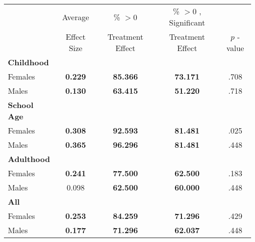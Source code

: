 \begin{tabular}{l c c c c}
\toprule
 & Average & \% $ >0 $ & \% $ >0 $ , Significant & \citet{Rosenbaum_2005_Distribution_JRSS} \\
 & Effect Size & Treatment Effect & Treatment Effect & $ p $ -value \\
\midrule
\textbf{Childhood} & & & & \\
\quad Females &  \textbf{    0.229} & \textbf{   85.366} & \textbf{   73.171} & .708 \\
\quad Males &  \textbf{    0.130} & \textbf{   63.415} & \textbf{   51.220} & .718 \\
\midrule
\textbf{School Age} & & & & \\
\quad Females &  \textbf{    0.308} & \textbf{   92.593} & \textbf{   81.481} & .025 \\
\quad Males &  \textbf{    0.365} & \textbf{   96.296} & \textbf{   81.481} & .448 \\
\midrule
\textbf{Adulthood} & & & & \\
\quad Females &  \textbf{    0.241} & \textbf{   77.500} & \textbf{   62.500} & .183 \\
\quad Males &      0.098 & \textbf{   62.500} & \textbf{   60.000} & .448 \\
\midrule
\textbf{All} & & & & \\
\quad Females &  \textbf{    0.253} & \textbf{   84.259} & \textbf{   71.296} & .429 \\
\quad Males &  \textbf{    0.177} & \textbf{   71.296} & \textbf{   62.037} & .448 \\
\bottomrule
\end{tabular}
